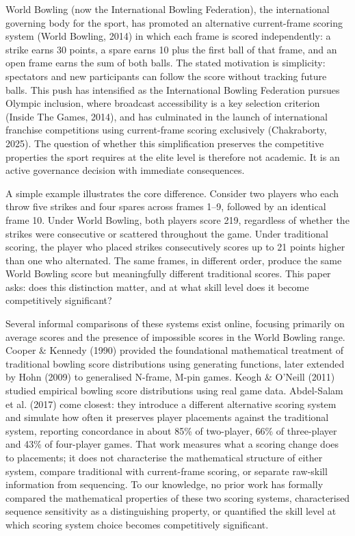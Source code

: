 \documentclass[
  letterpaper,
  DIV=11,
  numbers=noendperiod]{scrartcl}
\begin{document}
World Bowling (now the International Bowling Federation), the
international governing body for the sport, has promoted an alternative
current-frame scoring system (World Bowling, 2014) in which each frame
is scored independently: a strike earns 30 points, a spare earns 10 plus
the first ball of that frame, and an open frame earns the sum of both
balls. The stated motivation is simplicity: spectators and new
participants can follow the score without tracking future balls. This
push has intensified as the International Bowling Federation pursues
Olympic inclusion, where broadcast accessibility is a key selection
criterion (Inside The Games, 2014), and has culminated in the launch of
international franchise competitions using current-frame scoring
exclusively (Chakraborty, 2025). The question of whether this
simplification preserves the competitive properties the sport requires
at the elite level is therefore not academic. It is an active governance
decision with immediate consequences.

A simple example illustrates the core difference. Consider two players
who each throw five strikes and four spares across frames 1--9, followed
by an identical frame 10. Under World Bowling, both players score 219,
regardless of whether the strikes were consecutive or scattered
throughout the game. Under traditional scoring, the player who placed
strikes consecutively scores up to 21 points higher than one who
alternated. The same frames, in different order, produce the same World
Bowling score but meaningfully different traditional scores. This paper
asks: does this distinction matter, and at what skill level does it
become competitively significant?

Several informal comparisons of these systems exist online, focusing
primarily on average scores and the presence of impossible scores in the
World Bowling range. Cooper \& Kennedy (1990) provided the foundational
mathematical treatment of traditional bowling score distributions using
generating functions, later extended by Hohn (2009) to generalised
N-frame, M-pin games. Keogh \& O'Neill (2011) studied empirical bowling
score distributions using real game data. Abdel-Salam et al. (2017) come
closest: they introduce a different alternative scoring system and
simulate how often it preserves player placements against the
traditional system, reporting concordance in about 85\% of two-player,
66\% of three-player and 43\% of four-player games. That work measures
what a scoring change does to placements; it does not characterise the
mathematical structure of either system, compare traditional with
current-frame scoring, or separate raw-skill information from
sequencing. To our knowledge, no prior work has formally compared the
mathematical properties of these two scoring systems, characterised
sequence sensitivity as a distinguishing property, or quantified the
skill level at which scoring system choice becomes competitively
significant.
\end{document}
